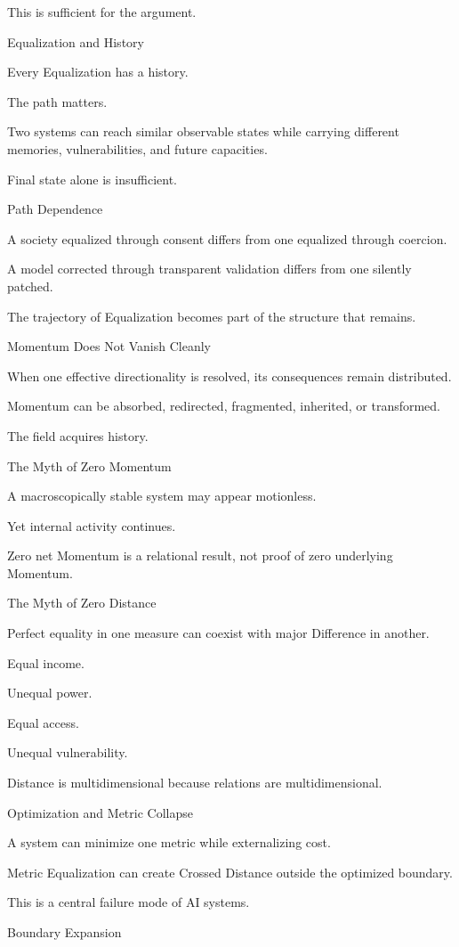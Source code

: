 This is sufficient for the argument.

Equalization and History

Every Equalization has a history.

The path matters.

Two systems can reach similar observable states while carrying different memories, vulnerabilities, and future capacities.

Final state alone is insufficient.

Path Dependence

A society equalized through consent differs from one equalized through coercion.

A model corrected through transparent validation differs from one silently patched.

The trajectory of Equalization becomes part of the structure that remains.

Momentum Does Not Vanish Cleanly

When one effective directionality is resolved, its consequences remain distributed.

Momentum can be absorbed, redirected, fragmented, inherited, or transformed.

The field acquires history.

The Myth of Zero Momentum

A macroscopically stable system may appear motionless.

Yet internal activity continues.

Zero net Momentum is a relational result, not proof of zero underlying Momentum.

The Myth of Zero Distance

Perfect equality in one measure can coexist with major Difference in another.

Equal income.

Unequal power.

Equal access.

Unequal vulnerability.

Distance is multidimensional because relations are multidimensional.

Optimization and Metric Collapse

A system can minimize one metric while externalizing cost.

Metric Equalization can create Crossed Distance outside the optimized boundary.

This is a central failure mode of AI systems.

Boundary Expansion

